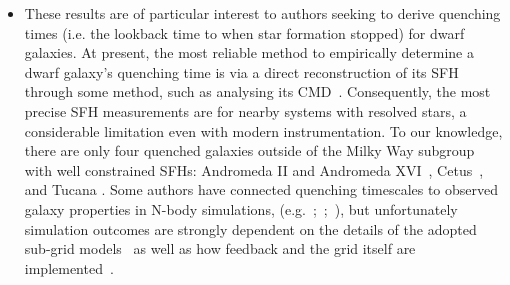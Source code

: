 \documentclass[ms.tex]{subfiles}
\begin{document}
\begin{itemize}
	\item These results are of particular interest to authors seeking to derive
	quenching times (i.e. the lookback time to when star formation stopped) for
	dwarf galaxies.
	At present, the most reliable method to empirically determine a dwarf
	galaxy's quenching time is via a direct reconstruction of its SFH through
	some method, such as analysing its CMD~\citep[e.g.][]{Sohn2013, Weisz2015}.
	Consequently, the most precise SFH measurements are for nearby systems with
	resolved stars, a considerable limitation even with modern instrumentation.
	To our knowledge, there are only four quenched galaxies outside of the
	Milky Way subgroup with well constrained SFHs: Andromeda II and Andromeda
	XVI~\citep{Weisz2014a}, Cetus~\citep{Monelli2010a}, and Tucana
	\citep{Monelli2010b}.
	Some authors have connected quenching timescales to observed galaxy
	properties in N-body simulations, (e.g.~\citealp{Phillips2014,
	Phillips2015};~\citealp*{Rocha2012};~\citealp{Slater2013, Slater2014,
	Wheeler2014}), but unfortunately simulation outcomes are strongly dependent
	on the details of the adopted sub-grid models~\citep[e.g.][]{Li2020} as
	well as how feedback and the grid itself are implemented~\citep{Hu2022}.


\end{itemize}
\end{document}
